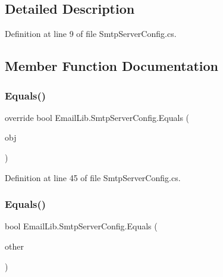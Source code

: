 \subsection{Detailed Description}


Definition at line 9 of file Smtp\+Server\+Config.\+cs.



\subsection{Member Function Documentation}
\mbox{\label{classEmailLib_1_1SmtpServerConfig_ad3b934765941f8a34ab83555a4313861}} 
\subsubsection{\texorpdfstring{Equals()}{Equals()}\hspace{0.1cm}{\footnotesize\ttfamily [1/2]}}
{\footnotesize\ttfamily override bool Email\+Lib.\+Smtp\+Server\+Config.\+Equals (\begin{DoxyParamCaption}\item[{object}]{obj }\end{DoxyParamCaption})}



Definition at line 45 of file Smtp\+Server\+Config.\+cs.

\mbox{\label{classEmailLib_1_1SmtpServerConfig_a3a2b3a9966a2fe362b3ab6a719286de9}} 
\subsubsection{\texorpdfstring{Equals()}{Equals()}\hspace{0.1cm}{\footnotesize\ttfamily [2/2]}}
{\footnotesize\ttfamily bool Email\+Lib.\+Smtp\+Server\+Config.\+Equals (\begin{DoxyParamCaption}\item[{\mbox{\hyperlink{classEmailLib_1_1SmtpServerConfig}{Smtp\+Server\+Config}}}]{other }\end{DoxyParamCaption})}



